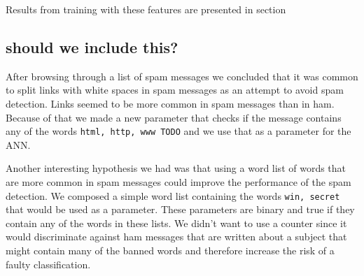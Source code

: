   Results from training with these features are presented in section

  \subsection{should we include this?}
  After browsing through a list of spam messages we concluded that it was
  common to split links with white spaces in spam messages as an attempt to
  avoid spam detection. Links seemed to be more common in spam messages than in
  ham. Because of that we made a new parameter that checks if the message
  contains any of the words \texttt{html, http, www TODO} and we use that as a
  parameter for the ANN. 

  Another interesting hypothesis we had was that using a word list of words
  that are more common in spam messages could improve the performance of the
  spam detection. We composed a simple word list containing the words
  \texttt{win, secret} that would be used as a parameter.  These parameters are
  binary and true if they contain any of the words in these lists. We didn't
  want to use a counter since it would discriminate against ham messages that
  are written about a subject that might contain many of the banned words and
  therefore increase the risk of a faulty classification. 

